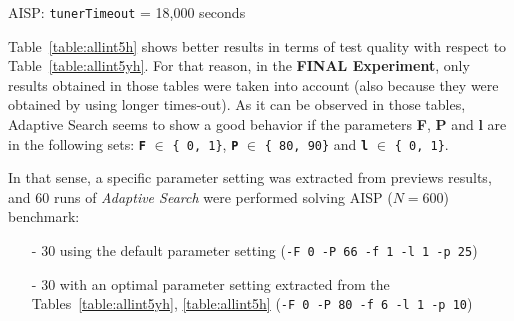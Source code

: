 \begin{table}[h] 	
\centering 
\renewcommand{\arraystretch}{1.2}
\caption{AISP: \texttt{tunerTimeout} = 18,000 seconds}\label{table:allint5h}
\end{table}

Table~\ref{table:allint5h} shows better results in terms of test quality with respect to Table~\ref{table:allint5yh}. For that reason, in the \textbf{FINAL Experiment}, only results obtained in those tables were taken into account (also because they were obtained by using longer times-out). As it can be observed in those tables, Adaptive Search seems to show a good behavior if the parameters {\bf F}, {\bf P} and {\bf l} are in the following sets: \texttt{\bf F} $\in$ \texttt{\{ 0, 1\}}, \texttt{\bf P} $\in$ \texttt{\{ 80, 90\}} and \texttt{\bf l} $\in$ \texttt{\{ 0, 1\}}.

In that sense, a specific parameter setting was extracted from previews results, and 60 runs of {\it Adaptive Search} were performed solving AISP ($N = 600$) benchmark:
\begin{itemize}
	\item[-] 30 using the default parameter setting (\texttt{-F 0 -P 66 -f 1 -l 1 -p 25})
	\item[-] 30 with an optimal parameter setting extracted from the Tables~\ref{table:allint5yh}, \ref{table:allint5h} (\texttt{-F 0 -P 80 -f 6 -l 1 -p 10})
\end{itemize}

